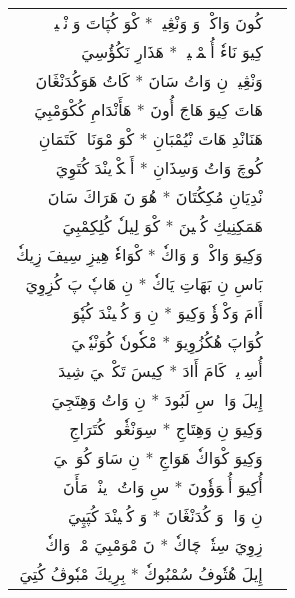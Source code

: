 \documentclass[a4paper, 12pt]{report}
\begin{document}
\begin{longtable}{rl}
\textarabic{كُونَ وَاكْوٖ وَ وَنْڠِينٖ  *  كْوَ كُپَاتَ وَدٖنْڠٖينٖ} & \\ 
\textarabic{كِيوَ نَاءٗ أُپٖمْبٖينٖ  *  هَذَارِ نَكُؤُسِيَ} & \\ 
[8mm] 

\textarabic{وَنْڠِينٖ نِ وَاتُ سَانَ  *  كَاتُ هَوَكُدَنْڠَانَ} & \\ 
\textarabic{هَاتَ كِيوَ هَاجَ أُونَ  *  هَأَنْدَامِ كُكْوَمْبِيَ} & \\ 
[8mm] 

\textarabic{هَنَانْدِ هَاتَ نْيُمْبَانِ  *  كْوَ مْوَنَاوٖ كَتَمَانِ} & \\ 
\textarabic{كُوچَ وَاتُ وَسِذَانِ  *  أَمٖكْوٖينْدَ كُتَوِيَ} & \\ 
[8mm] 

\textarabic{نْدِيَانِ مُكِكُتَانَ  *  هُوَ نَ هَرَاكَ سَانَ} & \\ 
\textarabic{هَمَكِنِيكِ كُنٖينَ  *  كْوَ لِيلٗ كُلِكِمْبِيَ} & \\ 
[8mm] 

\textarabic{وَكِيوَ وَاكْوٖ وَ وَاكٗ  *  كْوَاءٗ هِيزِ سِيفَ زِيكٗ} & \\ 
\textarabic{بَاسِ نِ بَهَاتِ يَاكٗ  *  نِ هَاپٗ پَ كُزِوِيَ} & \\ 
[8mm] 

\textarabic{أَامَ وَكْوٖؤٗ وَكِيوَ  *  نِ وَ كُپٖينْدَ كُپٗوَ} & \\ 
\textarabic{كُوَاپَ هُكُزُوِيوَ  *  مْكٗونٗ كُوَنْيٗشٖيَ} & \\ 
[8mm] 

\textarabic{أُسِوٖيكٖ كَامَ أَادَ  *  كِيسَ تَكْوٖتٖيَ شِيدَ} & \\ 
\textarabic{إِيلَ وَاوٖ سِ لَبُودَ  *  نِ وَاتُ وَهِتَجِيَ} & \\ 
[8mm] 

\textarabic{وَكِيوَ نِ وَهِتَاجِ  *  سِوَنْڠٗوجٖ كُتَرَاجِ} & \\ 
\textarabic{وَكِيوَ كْوَاكٗ هَوَاجِ  *  نِ سَاوَ كُوَپٖكٖيَ} & \\ 
[8mm] 

\textarabic{أُكِيوَ أُمٖوَؤٗونَ  *  سِ وَاتُ وٖينْيٖ مَأَنَ} & \\ 
\textarabic{نِ وَالٖ وَ كُدَنْڠَانَ  *  وَ كُپٖينْدَ كُپَپِيَ} & \\ 
[8mm] 

\textarabic{زِوِيَ سِتٗوٖ چَاكٗ  *  نَ مْوَمْبِيَ مْكٖ وَاكٗ} & \\ 
\textarabic{إِيلَ هُتٗوفُ سُمْبُوكٗ  *  بِرِيكَ مْبٗوڤُ كُتِيَ} & \\ 
[8mm] 


\end{longtable}
\end{document}
